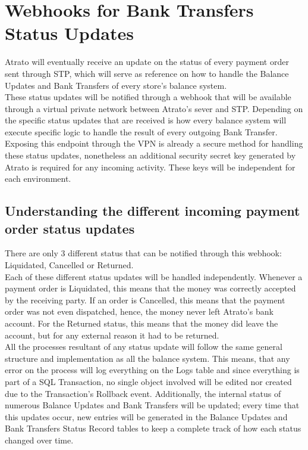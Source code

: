 \section{Webhooks for Bank Transfers Status Updates}

Atrato will eventually receive an update on the status of every payment order sent through STP, which will serve as reference on how to handle the Balance Updates and Bank Transfers of every store’s balance system.\\

These status updates will be notified through a webhook that will be available through a virtual private network between Atrato’s sever and STP. Depending on the specific status updates that are received is how every balance system will execute specific logic to handle the result of every outgoing Bank Transfer.\\

Exposing this endpoint through the VPN is already a secure method for handling these status updates, nonetheless an additional security secret key generated by Atrato is required for any incoming activity. These keys will be independent for each environment.\\

\subsection{Understanding the different incoming payment order status updates}

There are only 3 different status that can be notified through this webhook: Liquidated, Cancelled or Returned.\\

Each of these different status updates will be handled independently. Whenever a payment order is Liquidated, this means that the money was correctly accepted by the receiving party. If an order is Cancelled, this means that the payment order was not even dispatched, hence, the money never left Atrato’s bank account. For the Returned status, this means that the money did leave the account, but for any external reason it had to be returned.\\

All the processes resultant of any status update will follow the same general structure and implementation as all the balance system. This means, that any error on the process will log everything on the Logs table and since everything is part of a SQL Transaction, no single object involved will be edited nor created due to the Transaction’s Rollback event. Additionally, the internal status of numerous Balance Updates and Bank Transfers will be updated; every time that this updates occur, new entries will be generated in the Balance Updates and Bank Transfers Status Record tables to keep a complete track of how each status changed over time.\\

